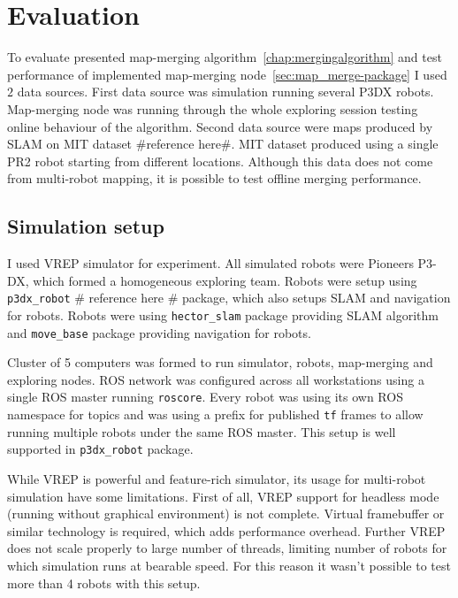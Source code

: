 \chapter{Evaluation}
\label{chap:evaluation}

To evaluate presented map-merging algorithm~\ref{chap:mergingalgorithm} and test performance of implemented map-merging node~\ref{sec:map_merge-package} I used $2$ data sources. First data source was simulation running several P3DX robots. Map-merging node was running through the whole exploring session testing online behaviour of the algorithm. Second data source were maps produced by \gls{SLAM} on \gls{MIT} dataset \#reference here\#. \gls{MIT} dataset produced using a single PR2 robot starting from different locations. Although this data does not come from multi-robot mapping, it is possible to test offline merging performance.

\section{Simulation setup}

I used \gls{VREP} simulator for experiment. All simulated robots were Pioneers P3-DX, which formed a homogeneous exploring team. Robots were setup using \texttt{p3dx\_robot} \# reference here \# package, which also setups \gls{SLAM} and navigation for robots. Robots were using \texttt{hector\_slam} package providing \gls{SLAM} algorithm and \texttt{move\_base} package providing navigation for robots.

Cluster of 5 computers was formed to run simulator, robots, map-merging and exploring nodes. \gls{ROS} network was configured across all workstations using a single \gls{ROS} master running \texttt{roscore}. Every robot was using its own \gls{ROS} namespace for topics and was using a prefix for published \texttt{tf} frames to allow running multiple robots under the same \gls{ROS} master. This setup is well supported in \texttt{p3dx\_robot} package.

While \gls{VREP} is powerful and feature-rich simulator, its usage for multi-robot simulation have some limitations. First of all, \gls{VREP} support for headless mode (running without graphical environment) is not complete. Virtual framebuffer or similar technology is required, which adds performance overhead. Further \gls{VREP} does not scale properly to large number of threads, limiting number of robots for which simulation runs at bearable speed. For this reason it wasn't possible  to test more than 4 robots with this setup.

